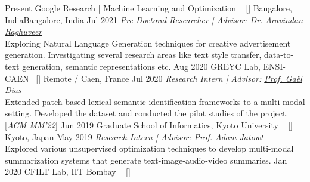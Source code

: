 
\begin{experiences}

\researchexperience
    {Present}   {Google Research | Machine Learning and Optimization {\normalfont  ~ [\href{https://research.google/teams/india-research-lab/}{\small{\websiteSymbol}}]
    }}{Bangalore, India}{Bangalore, India}
    {Jul 2021} {\textit{Pre-Doctoral Researcher | Advisor:  \href{https://research.google/people/107631/}{Dr. Aravindan Raghuveer}}\\
    Exploring Natural Language Generation techniques for creative advertisement generation. Investigating several research areas like text style transfer, data-to-text generation, semantic representations etc.
    \vskip 0.1cm
    }
  \emptySeparator
    \researchexperience
    {Aug 2020}   {GREYC Lab, ENSI-CAEN{\normalfont  ~ [\href{https://www.ensicaen.fr/en/research/greyc/}{\small{\websiteSymbol}}]
    }}{Remote / Caen, France}{}
    {Jul 2020} {\textit{Research Intern | Advisor: \href{https://dias.users.greyc.fr/}{Prof. Gaël Dias}}\\
    Extended patch-based lexical semantic identification frameworks to a multi-modal setting. Developed the dataset and conducted the pilot studies of the project. [\textit{ACM MM'22}]
    }
  \emptySeparator
   \researchexperience
    {Jun 2019}   {Graduate School of Informatics, Kyoto University {\normalfont  ~ [\href{http://www.i.kyoto-u.ac.jp/en/}{\small{\websiteSymbol}}]
    }}{Kyoto, Japan}{}
    {May 2019} {\textit{Research Intern | Advisor: \href{https://adammo12.github.io/adamjatowt/}{Prof. Adam Jatowt}}\\
    Explored various unsupervised optimization techniques to develop multi-modal summarization systems that generate text-image-audio-video summaries. %
    }
  \emptySeparator
   \researchexperience
    {Jan 2020}   {CFILT Lab, IIT Bombay {\normalfont  ~ [\href{https://www.cfilt.iitb.ac.in/}{\small{\websiteSymbol}}]
}}
\end{experiences}
